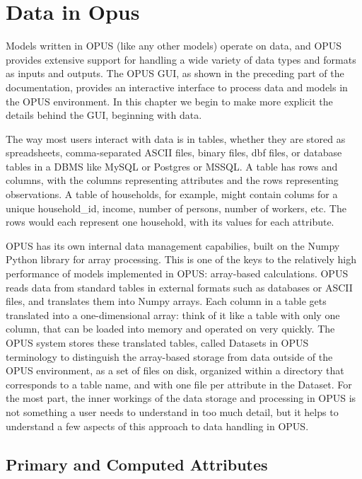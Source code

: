 \chapter{Data in Opus}
\label{chap:data-in-opus}

Models written in OPUS (like any other models) operate on data, and OPUS provides extensive support for handling a wide variety of data types and formats as inputs and outputs. 
The OPUS GUI, as shown in the preceding part of the documentation, provides an interactive interface to process data and models in the OPUS environment.  In this chapter we begin
to make more explicit the details behind the GUI, beginning with data.

The way most users interact with data is in tables, whether they are stored as spreadsheets, comma-separated ASCII files, binary files, dbf files, or database tables in a DBMS like MySQL or Postgres or MSSQL.  A table has rows and columns, with the columns representing attributes and the rows representing observations.  A table of households, for example, might contain colums for a unique household_id, income, number of persons, number of workers, etc.  The rows would each represent one household, with its values for each attribute.

OPUS has its own internal data management capabilies, built on the Numpy Python library for array processing.  This is one of the keys to the relatively high performance of models implemented in OPUS: array-based calculations.  OPUS reads data from standard tables in external formats such as databases or ASCII files, and translates them into Numpy arrays.  Each column in a table gets translated into a one-dimensional array: think of it like a table with only one column, that can be loaded into memory and operated on very quickly.  The OPUS system stores these translated tables, called Datasets in OPUS terminology to distinguish the array-based storage from data outside of the OPUS environment, as a set of files on disk, organized within a directory that corresponds to a table name, and with one file per attribute in the Dataset.  For the most part, the inner workings of the data storage and processing in OPUS is not something a user needs to understand in too much detail, but it helps to understand a few aspects of this approach to data handling in OPUS.

\section{Primary and Computed Attributes}

